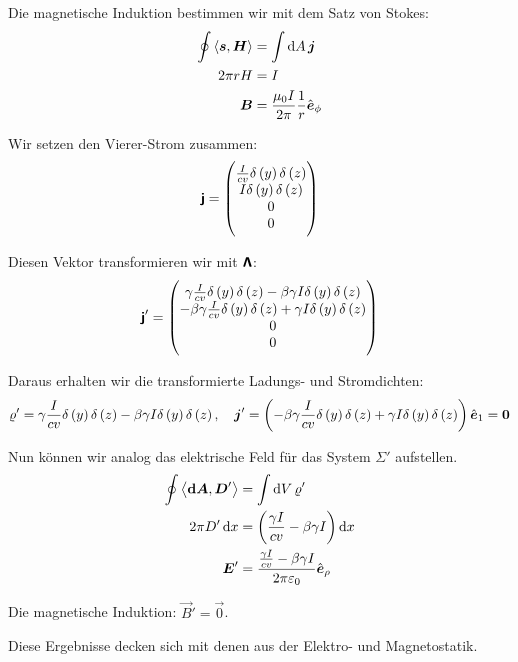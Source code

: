 Die magnetische Induktion bestimmen wir mit dem Satz von Stokes:
\begin{align*}
	\oint \inner{\vec s}{\vec H} &= \int \dif A \, \vec j \\
	2 \pi r H &= I \\
	\vec B &= \frac{\mu_0 I}{2 \pi} \frac 1r \ev_\phi
\end{align*}

Wir setzen den Vierer-Strom zusammen:
\[
	\tens j
	=
	\begin{pmatrix}
		\frac I{cv} \delta\del y \delta\del z \\
		I \delta\del y \delta\del z \\
		0 \\
		0
	\end{pmatrix}
\]

Diesen Vektor transformieren wir mit $\boldsymbol{\mathsf{\Lambda}}$:
\[
	\tens j'
	=
	\begin{pmatrix}
		\gamma \frac I{cv} \delta\del y \delta\del z
		- \beta\gamma I \delta\del y \delta\del z \\
		-\beta\gamma \frac I{cv} \delta\del y \delta\del z
		+ \gamma I \delta\del y \delta\del z \\
		0 \\
		0
	\end{pmatrix}
\]

Daraus erhalten wir die transformierte Ladungs- und Stromdichten:
\[
	\varrho'
	=
	\gamma \frac I{cv} \delta\del y \delta\del z
	- \beta\gamma I \delta\del y \delta\del z
	\eqnsep
	\vec j'
	=
	\del{
		-\beta\gamma \frac I{cv} \delta\del y \delta\del z
		+ \gamma I \delta\del y \delta\del z
	} \ev_1
	= \vec 0
\]

Nun können wir analog das elektrische Feld für das System $\Sigma'$ aufstellen.
\begin{align*}
	\oint \inner{\vec{\dif A}}{\vec D'}
	&=
	\int \dif V \, \varrho' \\
	2 \pi D' \dif x &= \del{\frac{\gamma I}{cv} - \beta\gamma I} \dif x \\
	\vec E' &= \frac{\frac{\gamma I}{cv} - \beta\gamma I}{2 \pi \varepsilon_0} \ev_\rho
\end{align*}

Die magnetische Induktion: $\vec B' = \vec 0$.

Diese Ergebnisse decken sich mit denen aus der Elektro- und Magnetostatik.


